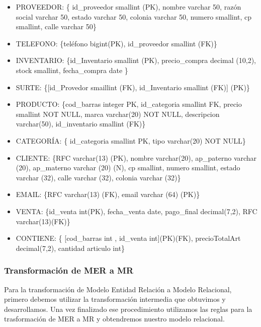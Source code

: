 \documentclass[12pt,letterpaper]{article}
\begin{document}
			\begin{itemize}
				\item PROVEEDOR: \{ id\_proveedor smallint (PK), nombre varchar 50, razón social varchar 50, estado varchar 50, colonia varchar 50, numero smallint, cp smallint, calle varchar 50\}
				\item TELEFONO: \{teléfono bigint(PK), id\_proveedor smallint (FK)\}
				
				\item INVENTARIO: \{id\_Inventario smallint (PK), precio\_compra decimal (10,2), stock smallint, fecha\_compra date \}
				
				\item SURTE: \{[id\_Provedor smaillint (FK), id\_Inventario smallint (FK)] (PK)\}
				
				\item PRODUCTO: \{cod\_barras integer PK, id\_categoria smallint FK, precio smallint NOT NULL, marca varchar(20) NOT NULL, descripcion varchar(50), id\_inventario smallint (FK)\}
				
				\item CATEGORÍA: \{ id\_categoria smallint PK, tipo varchar(20) NOT NULL\}
				
				\item CLIENTE: \{RFC varchar(13) (PK), nombre varchar(20), ap\_paterno varchar (20), ap\_materno varchar (20) (N), cp smallint, numero smallint, estado varchar (32), calle varchar (32), colonia varchar (32)\}
				
				\item EMAIL: \{RFC varchar(13) (FK), email varchar (64) (PK)\}
				
				\item VENTA: \{id\_venta int(PK), fecha\_venta date, pago\_final decimal(7,2), RFC varchar(13)(FK)\}
				
				\item CONTIENE: \{ [cod\_barras int , id\_venta int](PK)(FK), precioTotalArt decimal(7,2), cantidad articulo int\} 
			\end{itemize}
			
			\subsubsection{Transformación de MER a MR}
				Para la transformación de Modelo Entidad Relación a Modelo Relacional, primero debemos utilizar la transformación intermedia que obtuvimos y desarrollamos. Una vez finalizado ese procedimiento utilizamos las reglas para la trasformación de MER a MR y obtendremos nuestro modelo relacional.
\end{document}
